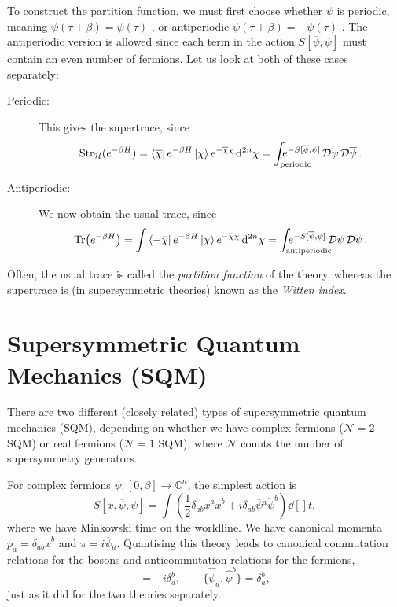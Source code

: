 To construct the partition function, we must first choose whether $\psi$  is periodic, meaning $\psi(\tau + \beta) = \psi(\tau)$ , or antiperiodic $\psi(\tau + \beta) = -\psi(\tau)$ . The antiperiodic version is allowed since each term in the action $S[\overline{\psi}{}, \psi]$ must contain an even number of fermions.
Let us look at both of these cases separately:
\begin{description}
  \item[Periodic:] This gives the supertrace, since
    \begin{equation}
      \text{Str}_{\mathcal{H}}(e^{-\beta H}) = \bra{\overline \chi} e^{- \beta H} \ket{\chi} e^{- \overline{\chi}{} \chi} \dd[2n]{\chi} = \int_{\mathrlap{\text{periodic}}} e^{-S[\overline{\psi}{}, \psi]} \pdd{\psi} \pdd{\overline{\psi}{}}.
    \end{equation}
  \item[Antiperiodic:] We now obtain the usual trace, since
    \begin{equation}
      \Tr(e^{-\beta H}) = \int \bra{- \overline{\chi}{}} e^{- \beta H} \ket{\chi} e^{- \overline{\chi}{} \chi} \dd[2n]{\chi} = \int_{\mathrlap{\text{antiperiodic}}} e^{-S[\overline{\psi}{}, \psi]} \pdd{\psi} \pdd{\overline{\psi}{}}.
    \end{equation}
\end{description}
\begin{definition}[]
  Often, the usual trace is called the \emph{partition function} of the theory, whereas the supertrace is (in supersymmetric theories) known as the \emph{Witten index}.
\end{definition}

\section{Supersymmetric Quantum Mechanics (SQM)}%
\label{sec:supersymmetric_quantum_mechanics_sqm_}

There are two different (closely related) types of supersymmetric quantum mechanics (SQM), depending on whether we have complex fermions ($\mathcal{N} = 2$ SQM) or real fermions ($\mathcal{N} = 1$ SQM), where $\mathcal{N}$ counts the number of supersymmetry generators.

For complex fermions $\psi \colon [0, \beta] \to \mathbb{C}^n$, the simplest action is
\begin{equation}
  S[x, \overline{\psi}{}, \psi] = \int \left( \frac{1}{2} \delta_{ab} \dot{x}^a \dot{x}^b + i \delta_{ab} \overline{\psi}{}^a \dot{\psi}^b \right) \dd[]{t},
\end{equation}
where we have Minkowski time on the worldline.
We have canonical momenta $p_a = \delta_{ab} \dot{x}^b$ and $\pi = i \overline{\psi}{}_a$.
Quantising this theory leads to canonical commutation relations for the bosons and anticommutation relations for the fermions, 
\begin{equation}
  [\hat{p}_a, \hat{x}^b] = -i \delta^b_a, \qquad \{\hat{\overline{\psi}{}}_a, \hat{\psi}^b\} = \delta_a^b,
\end{equation}
just as it did for the two theories separately.


